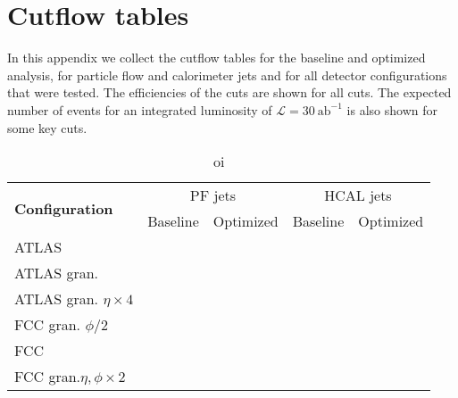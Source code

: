 
\chapter{Cutflow tables}
\label{chapter:cutflows}
In this appendix we collect the cutflow tables for the baseline and optimized analysis, for particle flow and calorimeter jets and for all detector configurations that were tested. The efficiencies of the cuts are shown for all cuts. The expected number of events for an integrated luminosity of $\mathcal{L}=30~\text{ab}^{-1}$ is also shown for some key cuts.

\begin{table}[h]
	\caption{oi}
	\label{table:}
	\centering
	\begin{tabular}{lcccc}
		\hline
		 \multirow{2}{*}{\textbf{Configuration}} & \multicolumn{2}{c}{PF jets}    & \multicolumn{2}{c}{HCAL jets} \\ \cline{2-5} 
		& Baseline & Optimized & Baseline  & Optimized           \\ \midrule \midrule
		ATLAS&  &                       &           &           \\ 
		\rowcolor{black!7}ATLAS gran.&  &  &           &           \\ 
		ATLAS gran. $\eta\times 4$&  &  &           &           \\ 
		\rowcolor{black!7}FCC gran. $\phi/2$&  &  &           &           \\ 
		FCC&  &  &           &           \\ 
		\rowcolor{black!7}FCC gran.$\eta,\phi \times 2$&  &  &           &           \\ \bottomrule
	\end{tabular}
	
\end{table}


